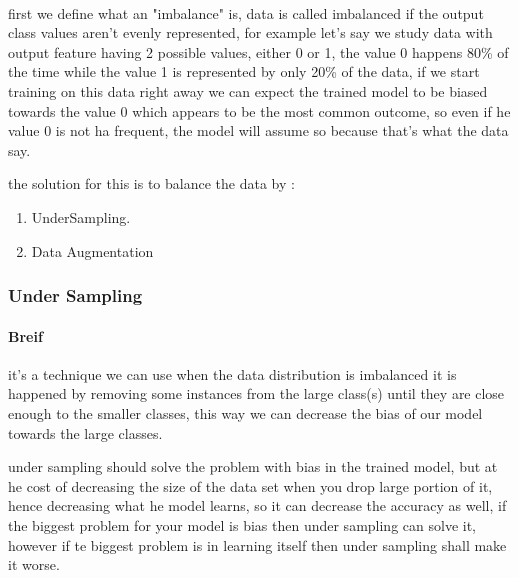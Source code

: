 \paragraph{}
first we define what an "imbalance" is, data is called imbalanced if the output class values aren't evenly represented, for example let's say we study data with output feature having 2 possible values, either 0 or 1, the value 0 happens 80\% of the time while the value 1 is represented by only 20\% of the data, if we start training on this data right away we can expect the trained model to be biased towards the value 0 which appears to be the most common outcome, so even if he value 0 is not ha frequent, the model will assume so because that's what the data say. \newline

the solution for this is to balance the data by :
\begin{enumerate}
	\item UnderSampling.
	\item Data Augmentation
\end{enumerate}
\subsubsection{Under Sampling}
\paragraph{Breif}
it's a technique we can use when the data distribution is imbalanced it is happened by removing some instances from the large class(s) until they are close enough to the smaller classes, this way we can decrease the bias of our model towards the large classes.\newline 

under sampling should solve the problem with bias in the trained model, but at he cost of decreasing the size of the data set when you drop large portion of it, hence decreasing what he model learns, so it can decrease the accuracy as well, if the biggest problem for your model is bias then under sampling can solve it, however if te biggest problem is in learning itself then under sampling shall make it worse.

